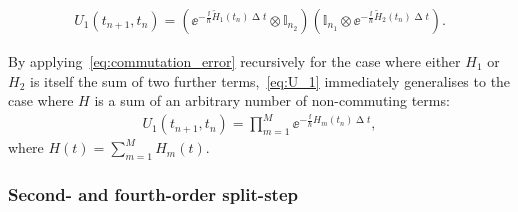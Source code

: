 \begin{align}\label{eq:U_1_subspace}
U_1(t_{n+1}, t_n) =
\left(\ee^{-\frac \ii \hbar \tilde H_1(t_n)\upDelta t}\otimes \mathbb{I}_{n_2}\right)
\left(\mathbb{I}_{n_1}\otimes\ee^{-\frac \ii \hbar \tilde H_2(t_n)\upDelta t}\right).
\end{align}

By applying~\eqref{eq:commutation_error} recursively for the case where either $H_1$ or $H_2$ is itself the sum of two further terms,~\eqref{eq:U_1} immediately generalises to the case where $H$ is a sum of an arbitrary number of non-commuting terms:
\begin{align}\label{eq:U_1_arbitrary_terms}
U_1(t_{n+1}, t_n) = \prod_{m=1}^M \ee^{-\frac \ii \hbar H_m(t_n)\upDelta t},
\end{align}
where $H(t) = \sum_{m=1}^M H_m(t)$.

\subsubsection{Second- and fourth-order split-step}

